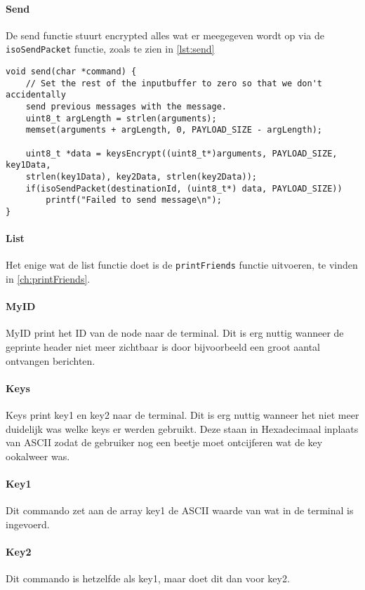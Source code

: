 \paragraph{Send}
De send functie stuurt encrypted alles wat er meegegeven wordt op via de \texttt{isoSendPacket} functie, zoals te zien in \autoref{lst:send}
\begin{lstlisting}[caption={De send functie},captionpos=b,label={lst:send},style=c,xleftmargin=.\textwidth,xrightmargin=.\textwidth]
void send(char *command) {
    // Set the rest of the inputbuffer to zero so that we don't accidentally 
    send previous messages with the message.
    uint8_t argLength = strlen(arguments);
    memset(arguments + argLength, 0, PAYLOAD_SIZE - argLength);

    uint8_t *data = keysEncrypt((uint8_t*)arguments, PAYLOAD_SIZE, key1Data, 
    strlen(key1Data), key2Data, strlen(key2Data));
    if(isoSendPacket(destinationId, (uint8_t*) data, PAYLOAD_SIZE)) 
        printf("Failed to send message\n");      
}
\end{lstlisting}


\paragraph{List}
Het enige wat de list functie doet is de \texttt{printFriends} functie uitvoeren, te vinden in \autoref{ch:printFriends}.


\paragraph{MyID}
MyID print het ID van de node naar de terminal. Dit is erg nuttig wanneer de geprinte header niet meer zichtbaar is door bijvoorbeeld een groot aantal ontvangen berichten.

\paragraph{Keys}
Keys print key1 en key2 naar de terminal. Dit is erg nuttig wanneer het niet meer duidelijk was welke keys er werden gebruikt. Deze staan in Hexadecimaal inplaats van ASCII zodat de gebruiker nog een beetje moet ontcijferen wat de key ookalweer was.

\paragraph{Key1}
Dit commando zet aan de array key1 de ASCII waarde van wat in de terminal is ingevoerd. 

\paragraph{Key2}
Dit commando is hetzelfde als key1, maar doet dit dan voor key2.